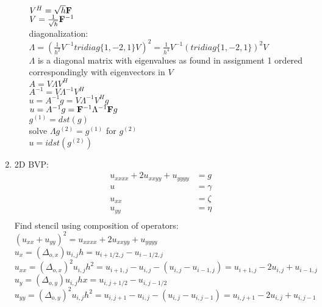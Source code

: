 \documentclass[12pt,letter]{article}
\begin{document}
\begin{enumerate}
\begin{enumerate}
    $V^H = \sqrt{h} \bold{F}$\\
    $V = \frac{1}{\sqrt{h}} \bold{F}^{-1}$\\

    diagonalization:\\
    $\Lambda= (\frac{1}{h^2} V^{-1}tridiag\{1,-2,1\} V)^2 = \frac{1}{h^4} V^{-1}(tridiag\{1,-2,1\})^2 V$\\

    $\Lambda$ is a diagonal matrix with eigenvalues as found in assignment 1 ordered correspondingly with eigenvectors in $V$\\

    $A=V \Lambda V^{H}$\\
    $A^{-1}=V \Lambda^{-1} V^{H}$\\
    $u=A^{-1}g=V \Lambda^{-1} V^{H} g$\\
    $u=A^{-1}g= \bold{F}^{-1} \Lambda^{-1} \bold{F} g$\\

    $g^{(1)}= dst(g)$\\
    solve $\Lambda g^{(2)} = g^{(1)}$ for $g^{(2)}$\\
    $u=idst(g^{(2)})$\\
    
  \end{enumerate}

  \pagebreak
  
\item 2D BVP:
  \begin{align*}
    u_{xxxx}+2u_{xxyy}+u_{yyyy} &= g\\
    u&=\gamma\\
    u_{xx}&=\zeta\\
    u_{yy}&=\eta\\
  \end{align*}
  Find stencil using composition of operators:\\
  $(u_{xx}+u_{yy})^2=u_{xxxx}+2u_{xxyy}+u_{yyyy}$\\
  $u_{x}=(\Delta_{o,x}) u_{i,j}h=u_{i+1/2,j}-u_{i-1/2,j}$\\
  $u_{xx}=(\Delta_{o,x})^2 u_{i,j}h^2=u_{i+1,j}-u_{i,j}-(u_{i,j}-u_{i-1,j})=u_{i+1,j}-2u_{i,j}+u_{i-1,j}$\\
  $u_{y}=(\Delta_{o,y}) u_{i,j}hx=u_{i,j+1/2}-u_{i,j-1/2}$\\
  $u_{yy}=(\Delta_{o,y})^2 u_{i,j}h^2=u_{i,j+1}-u_{i,j}-(u_{i,j}-u_{i,j-1})=u_{i,j+1}-2u_{i,j}+u_{i,j-1}$\\
  

\end{enumerate}
\end{document}
